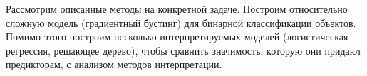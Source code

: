 Рассмотрим описанные методы на конкретной задаче. Построим относительно сложную модель (градиентный бустинг) для бинарной классификации объектов. Помимо этого построим несколько интерпретируемых моделей (логистическая регрессия, решающее дерево), чтобы сравнить значимость, которую они придают предикторам, с анализом методов интерпретации.